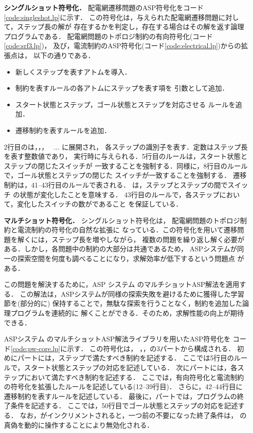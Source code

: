\textbf{シングルショット符号化．}
配電網遷移問題のASP符号化をコード\ref{code:singleshot.lp}に示す．
この符号化は，与えられた配電網遷移問題に対して，ステップ長の解が
存在するかを判定し，存在する場合はその解を返す論理プログラムである．
配電網問題のトポロジ制約の有向符号化(コード\ref{code:srf3.lp})，
及び，電流制約のASP符号化(コード\ref{code:electrical.lp})からの拡張点は，
以下の通りである．
\begin{itemize}
 \item 新しくステップを表すアトムを導入．
 \item 制約を表すルールの各アトムにステップを表す項を
       引数として追加．
 \item スタート状態とステップ，ゴール状態とステップを対応させる
       ルールを追加．
 \item 遷移制約を表すルールを追加．
\end{itemize}
2行目のは，，， ~... に展開され，
各ステップの識別子を表す．定数はステップ長を表す整数値であり，
実行時に与えられる．5行目のルールは，スタート状態とステップの閉じたスイッチが
一致することを強制する．同様に，8行目のルールで，ゴール状態とステップの閉じた
スイッチが一致することを強制する．
%
遷移制約は，41--43行目のルールで表される．
は，ステップとステップの間でスイッチ
の状態が変化したことを意味する．
43行目のルールで，各ステップにおいて，変化したスイッチの数がであること
を保証している．

\textbf{マルチショット符号化．}
シングルショット符号化は， 配電網問題のトポロジ制約と電流制約の符号化の自然な拡張に
なっている．この符号化を用いて遷移問題を解くには，ステップ長を増やしながら，
複数の問題を繰り返し解く必要がある．しかし，各問題中の制約の大部分は共通であるため，
ASPシステムが同一の探索空間を何度も調べることになり，求解効率が低下するという問題点
がある．

この問題を解決するために，ASP システム \clingo のマルチショットASP解法を適用する．
この解法は，ASPシステムが同様の探索失敗を避けるために獲得した学習節を(部分的に)
保持することで，無駄な探索を行うことなく，制約を追加した論理プログラムを連続的に
解くことができる．そのため，求解性能の向上が期待できる．

ASPシステム \clingo のマルチショットASP解法ライブラリを用いたASP符号化を
コード\ref{code:pw-core.lp}に示す．
この符号化は，
，，の3パートから構成される．
%
初めにパートには，ステップで満たすべき制約を記述する．
ここでは5行目のルールで，スタート状態とステップの対応を記述している．
%
次にパートには，各ステップにおいて満たすべき制約を記述する．
ここでは，有向符号化と電流制約の符号化を拡張したルールを記述している(12--39行目)．
さらに，42--44行目に遷移制約を表すルールを記述している．
%
最後に，パートでは，プログラムの終了条件を記述する．
ここでは，50行目でゴール状態とステップの対応を記述する．
なお，がインクリメントされると，一つ前の不要になった終了条件は，
の真偽を動的に操作することにより無効化される．

